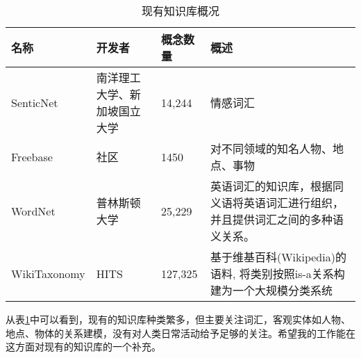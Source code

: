 \begin{table}[!h]
\begin{tabular}[0.7\textwidth]{|l|p{2cm}|l|p{4cm}|}
\hline
名称 & 开发者 & 概念数量  & 概述 \\
\hline
SenticNet & 南洋理工大学、新加坡国立大学 & 14,244	& 情感词汇  \\
\hline
Freebase & 社区	& 1450	& 对不同领域的知名人物、地点、事物 \\
\hline
WordNet\cite{miller1995wordnet} & 普林斯顿大学 & 25,229 & 英语词汇的知识库，根据同义语将英语词汇进行组织，并且提供词汇之间的多种语义关系。 \\
\hline
WikiTaxonomy\cite{ponzetto2007deriving}	& HITS & 127,325 & 基于维基百科(Wikipedia)的语料, 将类别按照is-a关系构建为一个大规模分类系统 \\
\hline
\end{tabular}
\caption{现有知识库概况}
\label{table:knowledge_base}
\end{table}

从表\ref{table:knowledge_base}中可以看到，现有的知识库种类繁多，但主要关注词汇，客观实体如人物、地点、物体的关系建模，没有对人类日常活动给予足够的关注。希望我的工作能在这方面对现有的知识库的一个补充。
